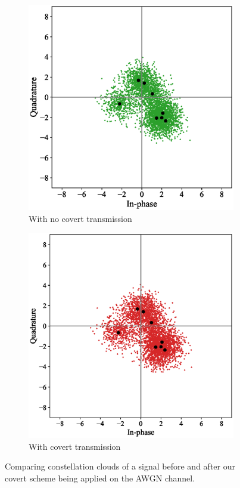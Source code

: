 \begin{figure}[tp!]
	\begin{subfigure}{0.24\textwidth}
		\includegraphics[width=\linewidth]{figs/awgn_normal_constellation}
		\caption{With no covert transmission}
	\end{subfigure}
	\hfill
	\begin{subfigure}{0.24\textwidth}
		\includegraphics[width=\linewidth]{figs/awgn_covert_constellation}
		\caption{With covert transmission}	
	\end{subfigure}
	\caption{Comparing constellation clouds of a signal before and after our covert scheme being applied on the AWGN channel.}
	\label{fig:awgn_constellation}
\end{figure}
